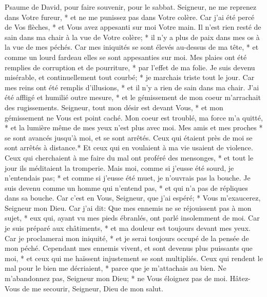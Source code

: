 Psaume de David, pour faire souvenir, pour le sabbat.
Seigneur, ne me reprenez dans Votre fureur, * et ne me punissez pas dans Votre colère.
Car j'ai été percé de Vos flèches, * et Vous avez appesanti sur moi Votre main.
Il n'est rien resté de sain dans ma chair à la vue de Votre colère; * il n'y a plus de paix dans mes os à la vue de mes péchés.
Car mes iniquités se sont élevés au-dessus de ma tête, * et comme un lourd fardeau elles se sont appesanties sur moi.
Mes plaies ont été remplies de corruption et de pourriture, * par l'effet de ma folie.
Je suis devenu misérable, et continuellement tout courbé; * je marchais triste tout le jour.
Car mes reins ont été remplis d'illusions, * et il n'y a rien de sain dans ma chair.
J'ai été affligé et humilié outre mesure, * et le gémissement de mon coeur m'arrachait des rugissements.
Seigneur, tout mon désir est devant Vous, * et mon gémissement ne Vous est point caché.
Mon coeur est troublé, ma force m'a quitté, * et la lumière même de mes yeux n'est plus avec moi.
Mes amis et mes proches * se sont avancés jusqu'à moi, et se sont arrêtés. Ceux qui étaient près de moi se sont arrêtés à distance.*
Et ceux qui en voulaient à ma vie usaient de violence. Ceux qui cherchaient à me faire du mal ont proféré des mensonges, * et tout le jour ils méditaient la tromperie.
Mais moi, comme si j'eusse été sourd, je n'entendais pas; * et comme si j'eusse été muet, je n'ouvrais pas la bouche.
Je suis devenu comme un homme qui n'entend pas, * et qui n'a pas de répliques dans sa bouche.
Car c'est en Vous, Seigneur, que j'ai espéré; * Vous m'exaucerez, Seigneur mon Dieu.
Car j'ai dit: Que mes ennemis ne se réjouissent pas à mon sujet, * eux qui, ayant vu mes pieds ébranlés, ont parlé insolemment de moi.
Car je suis préparé aux châtiments, * et ma douleur est toujours devant mes yeux.
Car je proclamerai mon iniquité, * et je serai toujours occupé de la pensée de mon péché.
Cependant mes ennemis vivent, et sont devenus plus puissants que moi, * et ceux qui me haïssent injustement se sont multipliés.
Ceux qui rendent le mal pour le bien me décriaient, * parce que je m'attachais au bien.
Ne m'abandonnez pas, Seigneur mon Dieu; * ne Vous éloignez pas de moi.
Hâtez-Vous de me secourir, Seigneur, Dieu de mon salut.

